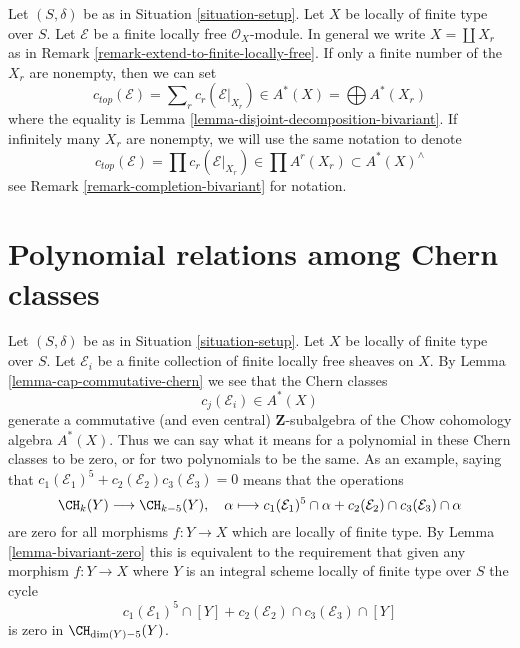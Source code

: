 \begin{remark}
\label{remark-top-chern-class}
Let $(S, \delta)$ be as in Situation \ref{situation-setup}. Let $X$
be locally of finite type over $S$. Let $\mathcal{E}$ be a
finite locally free $\mathcal{O}_X$-module. In general
we write $X = \coprod X_r$ as in
Remark \ref{remark-extend-to-finite-locally-free}.
If only a finite number of the $X_r$ are nonempty, then
we can set
$$
c_{top}(\mathcal{E}) = \sum\nolimits_r c_r(\mathcal{E}|_{X_r})
\in A^*(X) = \bigoplus A^*(X_r)
$$
where the equality is Lemma \ref{lemma-disjoint-decomposition-bivariant}.
If infinitely many $X_r$ are nonempty, we will use the same
notation to denote
$$
c_{top}(\mathcal{E}) = \prod c_r(\mathcal{E}|_{X_r})
\in \prod A^r(X_r) \subset A^*(X)^\wedge
$$
see Remark \ref{remark-completion-bivariant} for notation.
\end{remark}











\section{Polynomial relations among Chern classes}
\label{section-relations-chern-classes}

\noindent
Let $(S, \delta)$ be as in Situation \ref{situation-setup}. Let $X$ be locally
of finite type over $S$. Let $\mathcal{E}_i$ be a finite collection of finite
locally free sheaves on $X$. By Lemma \ref{lemma-cap-commutative-chern}
we see that the Chern classes
$$
c_j(\mathcal{E}_i) \in A^*(X)
$$
generate a commutative (and even central) $\mathbf{Z}$-subalgebra of the
Chow cohomology algebra $A^*(X)$.
Thus we can say what it means for a polynomial in these Chern classes
to be zero, or for two polynomials to be the same. As an example, saying that
$c_1(\mathcal{E}_1)^5 + c_2(\mathcal{E}_2)c_3(\mathcal{E}_3) = 0$
means that the operations
$$
\CH_k(Y) \longrightarrow \CH_{k - 5}(Y), \quad
\alpha \longmapsto
c_1(\mathcal{E}_1)^5 \cap \alpha +
c_2(\mathcal{E}_2) \cap c_3(\mathcal{E}_3) \cap \alpha
$$
are zero for all morphisms $f : Y \to X$ which are locally of finite type.
By Lemma \ref{lemma-bivariant-zero}
this is equivalent to the requirement that given any morphism
$f : Y \to X$  where $Y$ is an integral scheme
locally of finite type over $S$ the cycle
$$
c_1(\mathcal{E}_1)^5 \cap [Y] +
c_2(\mathcal{E}_2) \cap c_3(\mathcal{E}_3) \cap [Y]
$$
is zero in $\CH_{\dim(Y) - 5}(Y)$.

